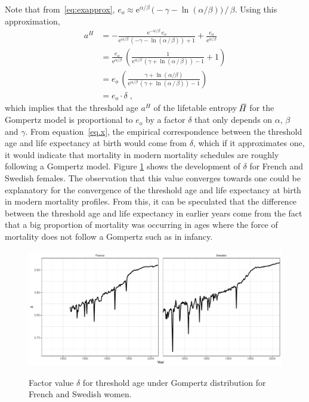 \documentclass[a4paper,twoside, openright, 12pt, leqno]{article}
\newcommand*\xbar[1]{%
   \hbox{%
     \vbox{%
       \hrule height 0.5pt %
       \kern0.3ex%
       \hbox{%
         \kern-0.28em%
         \ensuremath{#1}%
         \kern-0.05em%
       }%
     }%
   }%
}
\begin{document}
Note that from~\eqref{eq:exapprox}, $e_o\approx \mathrm{e}^{\alpha/\beta}\,\big(-\gamma-\ln(\alpha/\beta)\big)\,/\,\beta$. Using this approximation,
%
\begin{equation}
  \begin{split}
 	a^H & = -\frac{\mathrm{e}^{-\alpha/\beta}\,e_o}{\mathrm{e}^{\alpha/\beta}\,\left(-\gamma-\ln\left(\alpha\,/\,\beta\right)\right)+1}+\frac{e_o}{\mathrm{e}^{\alpha/\beta}}	\\
 	& = \frac{e_o}{\mathrm{e}^{\alpha/\beta}}\,\left(\frac{1}{\mathrm{e}^{\alpha/\beta}\,( \gamma+\ln\left(\alpha\,/\,\beta\right))-1}+1\right)	 \\
 	& = e_o\,\left(\frac{\gamma+\ln(\alpha/\beta)}{\mathrm{e}^{\alpha/\beta}\,( \gamma+\ln\left(\alpha\,/\,\beta\right))-1}\right)			 \\
 	& = e_o \cdot \delta\;,
  \end{split}
  \label{eq.x}
\end{equation}
%
which implies that the threshold age $a^H$ of the lifetable entropy $\,\xbar{H}$ for the Gompertz model is proportional to $e_o$ by a factor $\delta$ that only depends on $\alpha$, $\beta$ and $\gamma$. From equation~\eqref{eq.x}, the empirical correspondence between the threshold age and life expectancy at birth would come from $\delta$, which if it approximates one, it would  indicate that mortality in modern mortality schedules are roughly following a Gompertz model. Figure \ref{Fig:delta} shows the development of $\delta$ for French and Swedish females. The observation that this value converges towards one could be explanatory for the convergence of the threshold age and life expectancy at birth in modern mortality profiles. From this, it can be speculated that the difference between the threshold age and life expectancy in earlier years come from the fact that a big proportion of mortality was occurring in ages where the force of mortality does not follow a Gompertz such as in infancy.
\linebreak


\begin{figure}[h!]
\caption{Factor value $\delta$ for threshold age under Gompertz distribution for French and Swedish women.}
\centering
\includegraphics[scale=.6]{Figures/Figure_delta}
\label{Fig:delta}
\end{figure}
\end{document}
